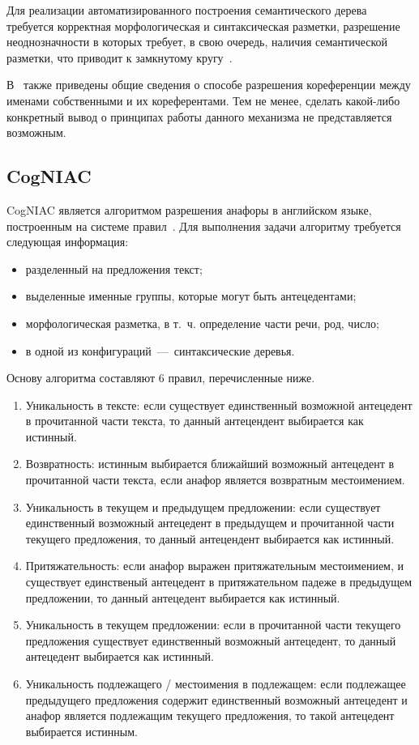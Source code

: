 Для реализации автоматизированного построения семантического дерева требуется корректная морфологическая и синтаксическая разметки, разрешение неоднозначности в которых требует, в свою очередь, наличия семантической разметки, что приводит к замкнутому кругу~\cite{Zaharov}.

В~\cite{bogdanov2014anaphora} также приведены общие сведения о способе разрешения кореференции между именами собственными и их кореферентами. Тем не менее, сделать какой-либо конкретный вывод о принципах работы данного механизма не представляется возможным.

\subsection{CogNIAC}

CogNIAC является алгоритмом разрешения анафоры в английском языке, построенным на системе правил~\cite{baldwin1997cogniac}. Для выполнения задачи алгоритму требуется следующая информация:
\begin{itemize}
	\item разделенный на предложения текст;
	\item выделенные именные группы, которые могут быть антецедентами;
	\item морфологическая разметка, в т.~ч. определение части речи, род, число;
	\item в одной из конфигураций~---~синтаксические деревья.
\end{itemize}

Основу алгоритма составляют 6 правил, перечисленные ниже.
\begin{enumerate}
	\item Уникальность в тексте: если существует единственный возможной антецедент в прочитанной части текста, то данный антецендент выбирается как истинный.
	\item Возвратность: истинным выбирается ближайший возможный антецедент в прочитанной части текста, если анафор является возвратным местоимением.
	\item Уникальность в текущем и предыдущем предложении: если существует единственный возможный антецедент в предыдущем и прочитанной части текущего предложения, то данный антецендент выбирается как истинный.
	\item Притяжательность: если анафор выражен притяжательным местоимением, и существует единственый антецедент в притяжательном падеже в предыдущем предложении, то данный антецедент выбирается как истинный.
	\item Уникальность в текущем предложении: если в прочитанной части текущего предложения существует единственный возможный антецедент, то данный антецедент выбирается как истинный.
	\item Уникальность подлежащего / местоимения в подлежащем: если подлежащее предыдущего предложения содержит единственный возможный антецедент и анафор является подлежащим текущего предложения, то такой антецедент выбирается истинным.
\end{enumerate}


